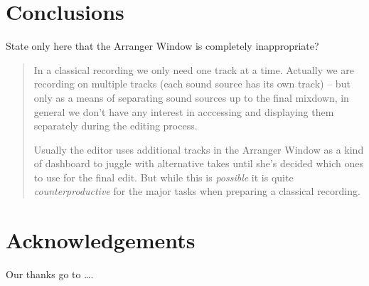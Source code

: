 \documentclass[11pt,a4paper]{article}
\begin{document}
\section{Conclusions}

State only here that the Arranger Window is completely inappropriate?

\begin{quote}


In a classical recording we only need one track at a time.
Actually we are recording on multiple tracks (each sound source has its own track) -- but only as a means of separating sound sources up to the final mixdown, in general we don't have any interest in acccessing and displaying them separately during the editing process.

Usually the editor uses additional tracks in the Arranger Window as a kind of dashboard to juggle with alternative takes until she's decided which ones to use for the final edit.
But while this is \emph{possible} it is quite \emph{counterproductive} for the major tasks when preparing a classical recording.
\end{quote}

\section{Acknowledgements}

Our thanks go to \ldots .
\end{document}

